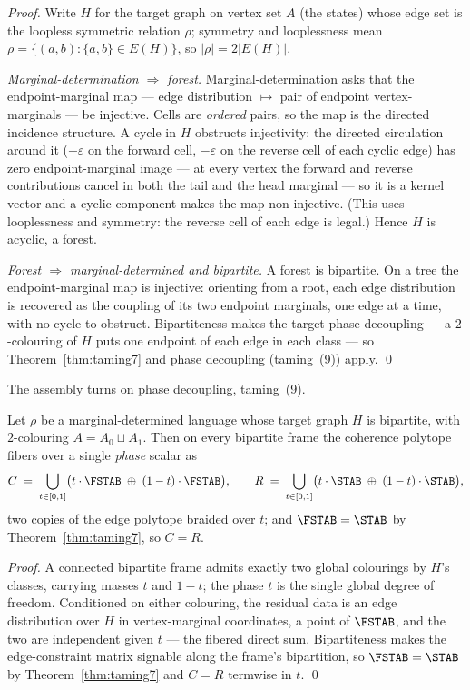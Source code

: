 \begin{proof}
Write $H$ for the target graph on vertex set $A$ (the states) whose edge set is
the loopless symmetric relation $\rho$; symmetry and looplessness mean
$\rho=\{(a,b):\{a,b\}\in E(H)\}$, so $|\rho|=2|E(H)|$.

\emph{Marginal-determination $\Rightarrow$ forest.} Marginal-determination asks
that the endpoint-marginal map --- edge distribution $\mapsto$ pair of endpoint
vertex-marginals --- be injective. Cells are \emph{ordered} pairs, so the map is
the directed incidence structure. A cycle in $H$ obstructs injectivity: the
directed circulation around it ($+\varepsilon$ on the forward cell, $-\varepsilon$
on the reverse cell of each cyclic edge) has zero endpoint-marginal image --- at
every vertex the forward and reverse contributions cancel in both the tail and the
head marginal --- so it is a kernel vector and a cyclic component makes the map
non-injective. (This uses looplessness and symmetry: the reverse cell of each edge
is legal.) Hence $H$ is acyclic, a forest.

\emph{Forest $\Rightarrow$ marginal-determined and bipartite.} A forest is
bipartite. On a tree the endpoint-marginal map is injective: orienting from a root,
each edge distribution is recovered as the coupling of its two endpoint marginals,
one edge at a time, with no cycle to obstruct. Bipartiteness makes the target
phase-decoupling --- a $2$-colouring of $H$ puts one endpoint of each edge in each
class --- so Theorem~\ref{thm:taming7} and phase decoupling (taming~(9)) apply. \qed
\end{proof}

The assembly turns on phase decoupling, taming~(9).

\begin{lemma}\label{lem:taming10}
Let $\rho$ be a marginal-determined language whose target graph $H$ is bipartite,
with $2$-colouring $A=A_0\sqcup A_1$. Then on every bipartite frame the coherence
polytope fibers over a single \emph{phase} scalar as
\[
  C \;=\; \bigcup_{t\in[0,1]} \bigl(t\cdot\FSTAB \;\oplus\; (1-t)\cdot\FSTAB\bigr),
  \qquad
  R \;=\; \bigcup_{t\in[0,1]} \bigl(t\cdot\STAB \;\oplus\; (1-t)\cdot\STAB\bigr),
\]
two copies of the edge polytope braided over $t$; and $\FSTAB=\STAB$ by
Theorem~\ref{thm:taming7}, so $C=R$.
\end{lemma}

\begin{proof}
A connected bipartite frame admits exactly two global colourings by $H$'s classes,
carrying masses $t$ and $1-t$; the phase $t$ is the single global degree of
freedom. Conditioned on either colouring, the residual data is an edge distribution
over $H$ in vertex-marginal coordinates, a point of $\FSTAB$, and the two are
independent given $t$ --- the fibered direct sum. Bipartiteness makes the
edge-constraint matrix signable along the frame's bipartition, so $\FSTAB=\STAB$ by
Theorem~\ref{thm:taming7} and $C=R$ termwise in $t$. \qed
\end{proof}

